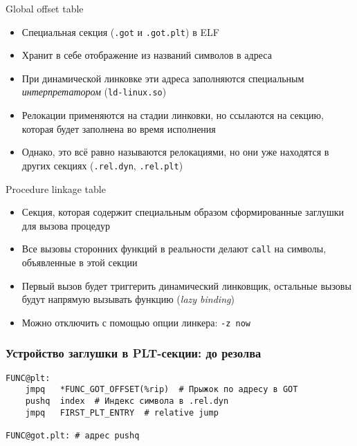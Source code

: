 \documentclass[10pt,pdf,hyperref={unicode}]{beamer}
\begin{document}
\begin{frame}{Global offset table}
\begin{itemize}
    \item Специальная секция (\texttt{.got} и \texttt{.got.plt}) в ELF
    \item Хранит в себе отображение из названий символов в адреса
    \item При динамической линковке эти адреса заполняются специальным \emph{интерпретатором} (\texttt{ld-linux.so})
    \item Релокации применяются на стадии линковки, но ссылаются на секцию, которая будет заполнена во время исполнения
    \item Однако, это всё равно называются релокациями, но они уже находятся в других секциях (\texttt{.rel.dyn}, \texttt{.rel.plt})
\end{itemize}
\end{frame}

\begin{frame}{Procedure linkage table}
\begin{itemize}
    \item Секция, которая содержит специальным образом сформированные заглушки для вызова процедур
    \item Все вызовы сторонних функций в реальности делают \texttt{call} на символы, объявленные в этой секции
    \item Первый вызов будет триггерить динамический линковщик, остальные вызовы будут напрямую вызывать функцию (\emph{lazy binding})
    \item Можно отключить с помощью опции линкера: \texttt{-z now}
\end{itemize}
\end{frame}

\begin{frame}[fragile]
\frametitle{Устройство заглушки в PLT-секции: до резолва}
\begin{center}
    \begin{minipage}{0.95\textwidth}
        \begin{verbatim}
FUNC@plt:
    jmpq   *FUNC_GOT_OFFSET(%rip)  # Прыжок по адресу в GOT
    pushq  index  # Индекс символа в .rel.dyn
    jmpq   FIRST_PLT_ENTRY  # relative jump

FUNC@got.plt: # адрес pushq

        \end{verbatim}
    \end{minipage}
\end{center}
\end{frame}
\end{document}
